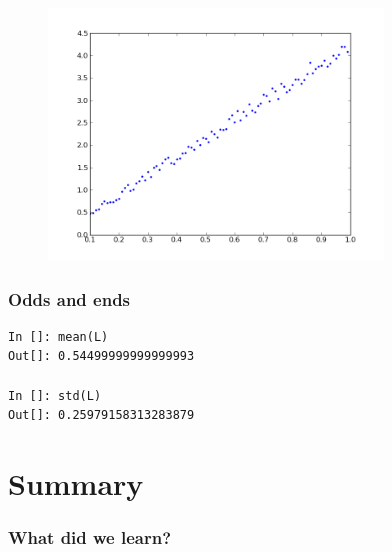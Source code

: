 \documentclass[14pt,compress]{beamer}
\begin{document}
\begin{frame}[fragile]
\begin{figure}
\includegraphics[width=3.5in]{data/L-Tsq.png}
\end{figure}
\end{frame}

\begin{frame}[fragile]
\frametitle{Odds and ends}
\begin{lstlisting}
In []: mean(L)
Out[]: 0.54499999999999993

In []: std(L)
Out[]: 0.25979158313283879
\end{lstlisting}
\end{frame}

\section {Summary}
\begin{frame}[fragile]
\frametitle{What did we learn?}
\end{frame}
\end{document}
